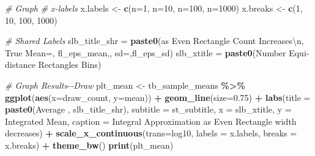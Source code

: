 \documentclass[
]{book}
\newenvironment{Shaded}{\begin{snugshade}}{\end{snugshade}}
\newcommand{\CharTok}[1]{\textcolor[rgb]{0.31,0.60,0.02}{#1}}
\newcommand{\CommentTok}[1]{\textcolor[rgb]{0.56,0.35,0.01}{\textit{#1}}}
\newcommand{\DataTypeTok}[1]{\textcolor[rgb]{0.13,0.29,0.53}{#1}}
\newcommand{\DecValTok}[1]{\textcolor[rgb]{0.00,0.00,0.81}{#1}}
\newcommand{\FloatTok}[1]{\textcolor[rgb]{0.00,0.00,0.81}{#1}}
\newcommand{\KeywordTok}[1]{\textcolor[rgb]{0.13,0.29,0.53}{\textbf{#1}}}
\newcommand{\NormalTok}[1]{#1}
\newcommand{\OperatorTok}[1]{\textcolor[rgb]{0.81,0.36,0.00}{\textbf{#1}}}
\newcommand{\StringTok}[1]{\textcolor[rgb]{0.31,0.60,0.02}{#1}}
\begin{document}
\begin{Shaded}
\begin{Highlighting}[]
\CommentTok{\# Graph}
\CommentTok{\# x{-}labels}
\NormalTok{x.labels \textless{}{-}}\StringTok{ }\KeywordTok{c}\NormalTok{(}\StringTok{\textquotesingle{}n=1\textquotesingle{}}\NormalTok{, }\StringTok{\textquotesingle{}n=10\textquotesingle{}}\NormalTok{, }\StringTok{\textquotesingle{}n=100\textquotesingle{}}\NormalTok{, }\StringTok{\textquotesingle{}n=1000\textquotesingle{}}\NormalTok{)}
\NormalTok{x.breaks \textless{}{-}}\StringTok{ }\KeywordTok{c}\NormalTok{(}\DecValTok{1}\NormalTok{, }\DecValTok{10}\NormalTok{, }\DecValTok{100}\NormalTok{, }\DecValTok{1000}\NormalTok{)}

\CommentTok{\# Shared Labels}
\NormalTok{slb\_title\_shr =}\StringTok{ }\KeywordTok{paste0}\NormalTok{(}\StringTok{\textquotesingle{}as Even Rectangle Count Increases}\CharTok{\textbackslash{}n}\StringTok{\textquotesingle{}}\NormalTok{,}
                       \StringTok{\textquotesingle{}True Mean=\textquotesingle{}}\NormalTok{, fl\_eps\_mean,}\StringTok{\textquotesingle{}, sd=\textquotesingle{}}\NormalTok{,fl\_eps\_sd)}
\NormalTok{slb\_xtitle =}\StringTok{ }\KeywordTok{paste0}\NormalTok{(}\StringTok{\textquotesingle{}Number Equi{-}distance Rectangles Bins\textquotesingle{}}\NormalTok{)}

\CommentTok{\# Graph Results{-}{-}Draw}
\NormalTok{plt\_mean \textless{}{-}}\StringTok{ }\NormalTok{tb\_sample\_means }\OperatorTok{\%\textgreater{}\%}
\StringTok{  }\KeywordTok{ggplot}\NormalTok{(}\KeywordTok{aes}\NormalTok{(}\DataTypeTok{x=}\NormalTok{draw\_count, }\DataTypeTok{y=}\NormalTok{mean)) }\OperatorTok{+}
\StringTok{  }\KeywordTok{geom\_line}\NormalTok{(}\DataTypeTok{size=}\FloatTok{0.75}\NormalTok{) }\OperatorTok{+}
\StringTok{  }\KeywordTok{labs}\NormalTok{(}\DataTypeTok{title =} \KeywordTok{paste0}\NormalTok{(}\StringTok{\textquotesingle{}Average \textquotesingle{}}\NormalTok{, slb\_title\_shr),}
       \DataTypeTok{subtitle =}\NormalTok{ st\_subtitle,}
       \DataTypeTok{x =}\NormalTok{ slb\_xtitle,}
       \DataTypeTok{y =} \StringTok{\textquotesingle{}Integrated Mean\textquotesingle{}}\NormalTok{,}
       \DataTypeTok{caption =} \StringTok{\textquotesingle{}Integral Approximation as Even Rectangle width decreases\textquotesingle{}}\NormalTok{) }\OperatorTok{+}
\StringTok{  }\KeywordTok{scale\_x\_continuous}\NormalTok{(}\DataTypeTok{trans=}\StringTok{\textquotesingle{}log10\textquotesingle{}}\NormalTok{, }\DataTypeTok{labels =}\NormalTok{ x.labels, }\DataTypeTok{breaks =}\NormalTok{ x.breaks) }\OperatorTok{+}
\StringTok{  }\KeywordTok{theme\_bw}\NormalTok{()}
\KeywordTok{print}\NormalTok{(plt\_mean)}
\end{Highlighting}
\end{Shaded}
\end{document}
